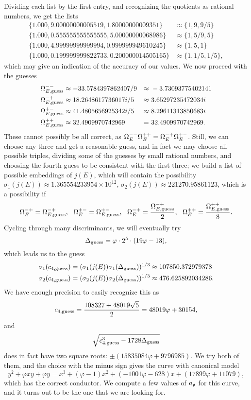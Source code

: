 \documentclass{amsart}
\begin{document}
Dividing each list by the first entry, and recognizing the quotients as rational
numbers, we get the lists
\[
\begin{split}
       \{1.000, 9.00000000005519, 1.80000000009351\}  &\approx \{1, 9, 9/5\}\\
       \{1.000, 0.555555555555555, 5.00000000068986 \} &\approx \{1, 5/9, 5\}\\
       \{1.000, 4.99999999999994, 0.999999949610245 \}  &\approx \{1, 5, 1\} \\ 
       \{1.000, 0.199999999822733, 0.200000014505165 \} &\approx \{1, 1/5, 1/5\},
\end{split}
\]
which may give an indication of the accuracy of our values. We now proceed with
the guesses
\begin{align*}
\phantom{MMMMM} \Omega^{--}_{E, \mathrm{guess}} &\approx -33.5784397862407/9 &\approx&\  -3.73093775402141 \phantom{MMMMM} \\
    \Omega^{-+}_{E, \mathrm{guess}} &\approx 18.2648617736017i/5 &\approx&\  3.65297235472034i \\
    \Omega^{+-}_{E, \mathrm{guess}} &\approx 41.4805656925342i/5 &\approx&\  8.29611313850683i \\
    \Omega^{++}_{E, \mathrm{guess}} &\approx 32.4909970742969    &=&\  32.4909970742969.
\end{align*}
These cannot possibly be all correct, as $\Omega^{--}_E \Omega^{++}_E = \Omega^{-+}_E \Omega^{+-}_E$.
Still, we can choose any three and get a reasonable guess, and in fact we may choose all
possible triples, dividing some of the guesses by small rational numbers, and choosing the
fourth guess to be consistent with the first three; we build a list of possible embeddings
of $j(E)$, which will contain the possibility $\sigma_1(j(E)) \approx 1.365554233954 \times 10^{12}$,
$\sigma_2(j(E)) \approx 221270.95861123$, which is a possibility if 
\[\Omegamp_E = \OmegampEguess,\ \ 
\Omegapm_E = \OmegapmEguess,\ \ \Omegamp_E = \frac{\OmegampEguess}{2},\ \ \Omegapp_E = \frac{\OmegappEguess}{8}.\]
Cycling through many discriminants, we will eventually try
\[
    \Delta_{\textrm{guess}} = \varphi \cdot 2^5 \cdot (19\varphi - 13),
\]
which leads us to the guess
\begin{align*}
    \sigma_1(c_{4,\textrm{guess}}) &= (\sigma_1(j(E)) \sigma_1(\Delta_{\textrm{guess}}))^{1/3} \approx 107850.372979378 \\
    \sigma_2(c_{4,\textrm{guess}}) &= (\sigma_2(j(E)) \sigma_2(\Delta_{\textrm{guess}}))^{1/3} \approx 476.625892034286.
\end{align*}
We have enough precision to easily recognize this as
\[
    c_{4,\textrm{guess}} = \frac{108327 + 48019 \sqrt5}{2} = 48019\varphi + 30154,
\]
and
\[
    \sqrt{c_{4,\textrm{guess}}^3 - 1728\Delta_{\textrm{guess}}}
\]
does in fact have two square roots: $\pm(15835084\varphi + 9796985)$. We try both of them, and
the choice with the minus sign gives the curve with canonical model
\[
y^2 + \varphi xy + \varphi y = x^3 + \left(\varphi - 1\right)x^2 + \left(-1001 \varphi - 628\right)x + \left(17899 \varphi + 11079\right),
\]
which has the correct conductor. We compute a few values of $a_{\mathfrak{p}}$ for this curve, and it turns
out to be the one that we are looking for.
\end{document}
